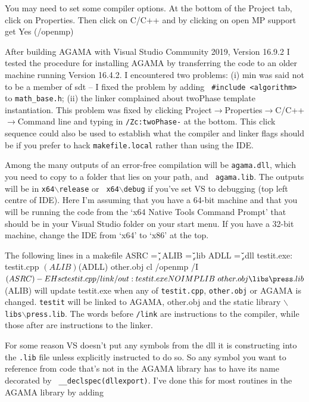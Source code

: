 You may need to set some compiler options. At the bottom of the Project tab, click on
Properties. Then click on C/C++ and by clicking on open MP support get Yes (/openmp)

After building AGAMA with Visual Studio Community 2019, Version 16.9.2 I
tested the procedure for installing AGAMA by transferring the code to an
older machine running Version 16.4.2. I encountered two problems: (i) min was
said not to be a member of sdt -- I fixed the problem by adding {\tt
\#include <algorithm>} to {\tt math\_base.h}; (ii) the linker complained
about twoPhase template instantiation. This problem was fixed by clicking
Project$\rightarrow$Properties$\rightarrow$C/C++$\rightarrow$Command line and
typing in {\tt /Zc:twoPhase-} at the bottom.  This click sequence could also
be used to establish what the compiler and linker flags should be if you
prefer to hack {\tt makefile.local} rather than using the IDE.
 

Among the many outputs of an error-free compilation will be {\tt agama.dll},
which you need to copy to a folder that lies on your path, and {\tt
agama.lib}. The outputs will be in {\tt x64$\backslash$release} or {\tt
x64$\backslash$debug} if you've set VS to debugging (top left centre of IDE).
Here I'm assuming that you have a 64-bit machine and that you will be running
the code from the `x64 Native Tools Command Prompt' that should be in your
Visual Studio folder on your start menu. If you have a 32-bit machine, change
the IDE from `x64' to `x86' at the top. 

The following lines in a makefile
\begintt
ASRC = \u\c\agama\agama
ALIB  = \u\c\agama\agama{}\release\agama.lib
ADLL  = \u\c\agama\agama{}\release\agama.dll
testit.exe: testit.cpp  $(ALIB) $(ADLL) other.obj
	cl /openmp /I$(ASRC) -EHsc testit.cpp /link /out:testit.exe NOIMPLIB \ 
	other.obj \libs\press.lib $(ALIB)
\endtt
will update testit.exe when any of {\tt testit.cpp}, {\tt other.obj} or AGAMA is changed. {\tt testit} will
be linked to AGAMA, other.obj and the static library
{\tt$\backslash$libs$\backslash$press.lib}. The words before {\tt/link} are instructions
to the compiler, while those after are instructions to the linker.

For some reason VS doesn't put any symbols from the dll it is constructing into the
{\tt.lib} file unless explicitly instructed to do so. So any symbol you want to reference
from code that's not in the AGAMA library has to have its name decorated by {\tt
\_\_declspec(dllexport)}. I've done this for most routines in the AGAMA library by adding

